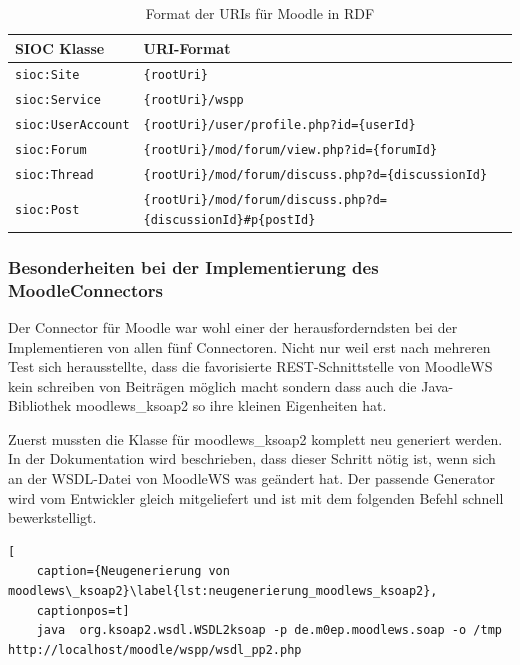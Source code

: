 \begin{table}[ht]
    \centering
    \caption{Format der URIs für Moodle in RDF}
    \begin{tabular}{l|p{13cm}}
        \textbf{SIOC Klasse} & \textbf{URI-Format} \\ 
        \hline
        \texttt{sioc:Site} & \texttt{\{rootUri\}}\\
        \texttt{sioc:Service} & \texttt{\{rootUri\}/wspp}\\
        \texttt{sioc:UserAccount} & \texttt{\{rootUri\}/user/profile.php?id=\{userId\}} \\
        \texttt{sioc:Forum} & \texttt{\{rootUri\}/mod/forum/view.php?id=\{forumId\}} \\
        \texttt{sioc:Thread} & \texttt{\{rootUri\}/mod/forum/discuss.php?d=\{discussionId\}} \\
        \texttt{sioc:Post} & \texttt{\{rootUri\}/mod/forum/discuss.php?d=\{discussionId\}\#p\{postId\}} \\
    \end{tabular}
    \label{tbl:moodle_sioc_uris}
\end{table}


\subsubsection{Besonderheiten bei der Implementierung des MoodleConnectors} %
\label{ssub:herausforderungen_bei_der_implementierung_des_moodleconnectors}

Der Connector für Moodle war wohl einer der herausforderndsten bei der Implementieren von allen fünf Connectoren. Nicht nur weil erst nach mehreren Test sich herausstellte, dass die favorisierte REST-Schnittstelle von MoodleWS kein schreiben von Beiträgen möglich macht sondern dass auch die Java-Bibliothek moodlews\_ksoap2 so ihre kleinen Eigenheiten hat. 

Zuerst mussten die Klasse für moodlews\_ksoap2 komplett neu generiert werden. In der Dokumentation wird beschrieben, dass dieser Schritt nötig ist, wenn sich an der WSDL-Datei von MoodleWS was geändert hat. Der passende Generator wird vom Entwickler gleich mitgeliefert und ist mit dem folgenden Befehl schnell bewerkstelligt.

\begin{lstlisting}[
    caption={Neugenerierung von moodlews\_ksoap2}\label{lst:neugenerierung_moodlews_ksoap2},
    captionpos=t]
    java  org.ksoap2.wsdl.WSDL2ksoap -p de.m0ep.moodlews.soap -o /tmp http://localhost/moodle/wspp/wsdl_pp2.php
\end{lstlisting}

